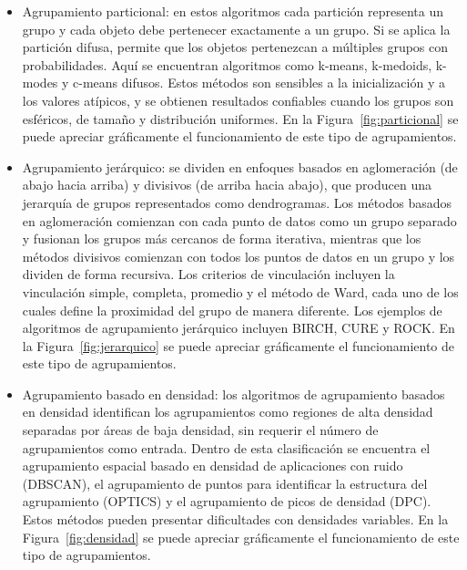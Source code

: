 \begin{itemize}
  \item Agrupamiento particional: en estos algoritmos cada partici\'on representa un grupo y cada objeto debe pertenecer exactamente a un grupo. Si se aplica la partici\'on difusa, permite que los objetos pertenezcan a m\'ultiples grupos con probabilidades. Aqu\'i se encuentran algoritmos como k-means, k-medoids, k-modes y c-means difusos. Estos m\'etodos son sensibles a la inicializaci\'on y a los valores at\'ipicos, y se obtienen resultados confiables cuando los grupos son esf\'ericos, de tama\~no y distribuci\'on uniformes. En la Figura~\ref{fig:particional} se puede apreciar gr\'aficamente el funcionamiento de este tipo de agrupamientos.
  \item Agrupamiento jer\'arquico: se dividen en enfoques basados en aglomeraci\'on (de abajo hacia arriba) y divisivos (de arriba hacia abajo), que producen una jerarqu\'ia de grupos representados como dendrogramas. Los m\'etodos basados en aglomeraci\'on comienzan con cada punto de datos como un grupo separado y fusionan los grupos m\'as cercanos de forma iterativa, mientras que los m\'etodos divisivos comienzan con todos los puntos de datos en un grupo y los dividen de forma recursiva. Los criterios de vinculaci\'on incluyen la vinculaci\'on simple, completa, promedio y el m\'etodo de Ward, cada uno de los cuales define la proximidad del grupo de manera diferente. Los ejemplos de algoritmos de agrupamiento jer\'arquico incluyen BIRCH, CURE y ROCK. En la Figura~\ref{fig:jerarquico} se puede apreciar gr\'aficamente el funcionamiento de este tipo de agrupamientos.
  \item Agrupamiento basado en densidad: los algoritmos de agrupamiento basados en densidad identifican los agrupamientos como regiones de alta densidad separadas por \'areas de baja densidad, sin requerir el n\'umero de agrupamientos como entrada. Dentro de esta clasificaci\'on se encuentra el agrupamiento espacial basado en densidad de aplicaciones con ruido (DBSCAN), el agrupamiento de puntos para identificar la estructura del agrupamiento (OPTICS) y el agrupamiento de picos de densidad (DPC). Estos m\'etodos pueden presentar dificultades con densidades variables. En la Figura~\ref{fig:densidad} se puede apreciar gr\'aficamente el funcionamiento de este tipo de agrupamientos.
\end{itemize}


